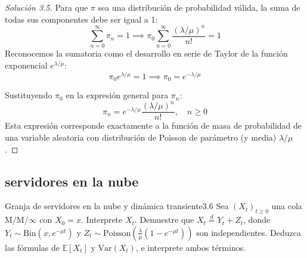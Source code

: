 \documentclass[10pt,a4paper]{article}
\begin{document}
\begin{proof}[Solución 3.5]
    Para que $\pi$ sea una distribución de probabilidad válida, la suma de todas sus componentes debe ser igual a 1:
    $$ \sum_{n=0}^\infty \pi_n = 1 \implies \pi_0 \sum_{n=0}^\infty \frac{(\lambda/\mu)^n}{n!} = 1 $$
    Reconocemos la sumatoria como el desarrollo en serie de Taylor de la función exponencial $e^{\lambda/\mu}$:
    $$ \pi_0 e^{\lambda/\mu} = 1 \implies \pi_0 = e^{-\lambda/\mu} $$
    
    Sustituyendo $\pi_0$ en la expresión general para $\pi_n$:
    $$ \pi_n = e^{-\lambda/\mu} \frac{(\lambda/\mu)^n}{n!}, \quad n \ge 0 $$
    Esta expresión corresponde exactamente a la función de masa de probabilidad de una variable aleatoria con distribución de Poisson de parámetro (y media) $\lambda/\mu$.
\end{proof}

\newpage
\subsection{servidores en la nube}

\begin{ejercicio}{Granja de servidores en la nube y dinámica transiente}{3.6}
    Sea $(X_t)_{t \ge 0}$ una cola M/M/$\infty$ con $X_0 = x$. Interprete $X_t$. Demuestre que $X_t \stackrel{d}{=} Y_t + Z_t$, donde $Y_t \sim \text{Bin}(x, e^{-\mu t})$ y $Z_t \sim \text{Poisson}(\frac{\lambda}{\mu}(1-e^{-\mu t}))$ son independientes. Deduzca las fórmulas de $\mathbb{E}[X_t]$ y $\text{Var}(X_t)$, e interprete ambos términos.
\end{ejercicio}
\end{document}
